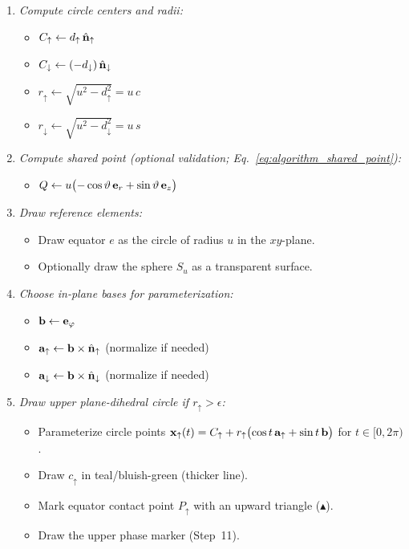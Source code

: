 \begin{enumerate}
\item \textit{Compute circle centers and radii:}
\begin{itemize}
    \item $C_\uparrow \gets d_\uparrow\,\hat{\mathbf{n}}_\uparrow$
    \item $C_\downarrow \gets (-d_\downarrow)\,\hat{\mathbf{n}}_\downarrow$
    \item $r_\uparrow \gets \sqrt{u^2-d_\uparrow^2}=u\,c$
    \item $r_\downarrow \gets \sqrt{u^2-d_\downarrow^2}=u\,s$
\end{itemize}

\item \textit{Compute shared point (optional validation; Eq.~\eqref{eq:algorithm_shared_point}):}
\begin{itemize}
    \item $Q \gets u\bigl(-\cos\vartheta\,\mathbf{e}_r + \sin\vartheta\,\mathbf{e}_{z}\bigr)$
\end{itemize}

\item \textit{Draw reference elements:}
\begin{itemize}
    \item Draw equator $e$ as the circle of radius $u$ in the $xy$-plane.
    \item Optionally draw the sphere $S_u$ as a transparent surface.
\end{itemize}

\item \textit{Choose in-plane bases for parameterization:}
\begin{itemize}
    \item $\mathbf{b} \gets \mathbf{e}_\varphi$
    \item $\mathbf{a}_\uparrow \gets \mathbf{b} \times \hat{\mathbf{n}}_\uparrow$ \quad (normalize if needed)
    \item $\mathbf{a}_\downarrow \gets \mathbf{b} \times \hat{\mathbf{n}}_\downarrow$ \quad (normalize if needed)
\end{itemize}

\item \textit{Draw upper plane-dihedral circle if $r_\uparrow>\epsilon$:}
\begin{itemize}
    \item Parameterize circle points $\mathbf{x}_\uparrow(t)=C_\uparrow + r_\uparrow\bigl(\cos t\,\mathbf{a}_\uparrow+\sin t\,\mathbf{b}\bigr)$ for $t\in[0,2\pi)$.
    \item Draw $c_\uparrow$ in teal/bluish-green (thicker line).
    \item Mark equator contact point $P_\uparrow$ with an upward triangle ($\blacktriangle$).
    \item Draw the upper phase marker (Step~11).
\end{itemize}


\end{enumerate}
